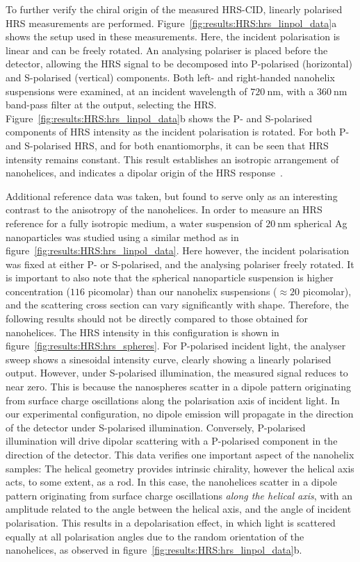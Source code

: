 To further verify the chiral origin of the measured HRS-CID, linearly polarised HRS measurements are performed. Figure~\ref{fig:results:HRS:hrs_linpol_data}a shows the setup used in these measurements. Here, the incident polarisation is linear and can be freely rotated. An analysing polariser is placed before the detector, allowing the HRS signal to be decomposed into P-polarised (horizontal) and S-polarised (vertical) components. Both left- and right-handed nanohelix suspensions were examined, at an incident wavelength of $\SI{720}{\nano\m}$, with a $\SI{360}{\nano\m}$ band-pass filter at the output, selecting the HRS. 
Figure~\ref{fig:results:HRS:hrs_linpol_data}b shows the P- and S-polarised components of HRS intensity as the incident polarisation is rotated. For both P- and S-polarised HRS, and for both enantiomorphs, it can be seen that HRS intensity remains constant. This result establishes an isotropic arrangement of nanohelices, and indicates a dipolar origin of the HRS response~\cite{Hao2002b, verbiest2009second}. 

Additional reference data was taken, but found to serve only as an interesting contrast to the anisotropy of the nanohelices. In order to measure an HRS reference for a fully isotropic medium, a water suspension of $\SI{20}{\nano\m}$ spherical Ag nanoparticles was studied using a similar method as in figure~\ref{fig:results:HRS:hrs_linpol_data}. Here however, the incident polarisation was fixed at either P- or S-polarised, and the analysing polariser freely rotated. 
It is important to also note that the spherical nanoparticle suspension is higher concentration ($116$ picomolar) than our nanohelix suspensions ($\approx 20$ picomolar), and the scattering cross section can vary significantly with shape.
Therefore, the following results should not be directly compared to those obtained for nanohelices.
The HRS intensity in this configuration is shown in figure~\ref{fig:results:HRS:hrs_spheres}. 
For P-polarised incident light, the analyser sweep shows a sinesoidal intensity curve, clearly showing a linearly polarised output. However, under S-polarised illumination, the measured signal reduces to near zero. This is because the nanospheres scatter in a dipole pattern originating from surface charge oscillations along the polarisation axis of incident light. 
In our experimental configuration, no dipole emission will propagate in the direction of the detector under S-polarised illumination. Conversely, P-polarised illumination will drive dipolar scattering with a P-polarised component in the direction of the detector. This data verifies one important aspect of the nanohelix samples: The helical geometry provides intrinsic chirality, however the helical axis acts, to some extent, as a rod. In this case, the nanohelices scatter in a dipole pattern originating from surface charge oscillations \textit{along the helical axis}, with an amplitude related to the angle between the helical axis, and the angle of incident polarisation. 
This results in a depolarisation effect, in which light is scattered equally at all polarisation angles due to the random orientation of the nanohelices, as observed in figure~\ref{fig:results:HRS:hrs_linpol_data}b.

